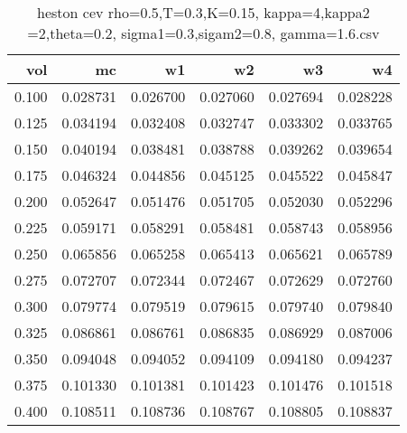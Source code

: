 \begin{table}
  \centering
  \caption{heston cev rho=0.5,T=0.3,K=0.15, kappa=4,kappa2 =2,theta=0.2, sigma1=0.3,sigam2=0.8, gamma=1.6.csv}
  \begin{tabular}{rrrrrr}
  \toprule
    vol &       mc &       w1 &       w2 &       w3 &       w4 \\
  \midrule
  0.100 & 0.028731 & 0.026700 & 0.027060 & 0.027694 & 0.028228 \\
  0.125 & 0.034194 & 0.032408 & 0.032747 & 0.033302 & 0.033765 \\
  0.150 & 0.040194 & 0.038481 & 0.038788 & 0.039262 & 0.039654 \\
  0.175 & 0.046324 & 0.044856 & 0.045125 & 0.045522 & 0.045847 \\
  0.200 & 0.052647 & 0.051476 & 0.051705 & 0.052030 & 0.052296 \\
  0.225 & 0.059171 & 0.058291 & 0.058481 & 0.058743 & 0.058956 \\
  0.250 & 0.065856 & 0.065258 & 0.065413 & 0.065621 & 0.065789 \\
  0.275 & 0.072707 & 0.072344 & 0.072467 & 0.072629 & 0.072760 \\
  0.300 & 0.079774 & 0.079519 & 0.079615 & 0.079740 & 0.079840 \\
  0.325 & 0.086861 & 0.086761 & 0.086835 & 0.086929 & 0.087006 \\
  0.350 & 0.094048 & 0.094052 & 0.094109 & 0.094180 & 0.094237 \\
  0.375 & 0.101330 & 0.101381 & 0.101423 & 0.101476 & 0.101518 \\
  0.400 & 0.108511 & 0.108736 & 0.108767 & 0.108805 & 0.108837 \\
  \bottomrule
  \end{tabular}
\end{table}

